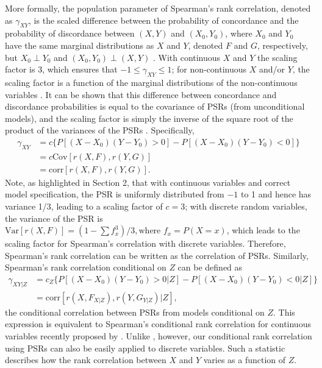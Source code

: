 \documentclass[12pt, usenatbib]{article}
\begin{document}
More formally, the population parameter of Spearman's rank correlation, denoted as $\gamma_{XY}$, is the scaled difference between the probability of concordance and the probability of discordance between $(X,Y)$ and $(X_0,Y_0)$, where $X_0$ and $Y_0$ have the same marginal distributions as $X$ and $Y$, denoted $F$ and $G$, respectively, but $X_0 \perp Y_0$ and $(X_0,Y_0) \perp (X,Y)$ \citep{kruskal1958}.  With continuous $X$ and $Y$ the scaling factor is 3, which ensures that $-1 \leq \gamma_{XY} \leq 1$;  for non-continuous $X$ and/or $Y$, the scaling factor is a function of the marginal distributions of the non-continuous variables \citep{neslehova2007}.  It can be shown that this difference between concordance and discordance probabilities is equal to the covariance of PSRs (from unconditional models), and the scaling factor is simply the inverse of the square root of the product of the variances of the PSRs  \citep{liu2016}.  Specifically,
\begin{align*}
\gamma_{XY}&=c\{P[(X-X_0)(Y-Y_0)>0]-P[(X-X_0)(Y-Y_0)<0]\} \\
&=c{\text{Cov}[r(X, F), r(Y, G)]} \\
&={\text{corr}[r(X, F), r(Y, G)]}.
\end{align*}
Note, as highlighted in Section 2, that with continuous variables and correct model specification, the PSR is uniformly distributed from $-1$ to 1 and hence has variance 1/3, leading to a scaling factor of $c=3$; with discrete random variables, the variance of the PSR is $\text{Var}[r(X, F)]=(1-\sum f_x^3)/3, \text{where }f_x=P(X=x)$, which leads to the scaling factor for Spearman's correlation with discrete variables.  Therefore, Spearman's rank correlation can be written as the correlation of PSRs.  
Similarly, Spearman's rank correlation conditional on $Z$ can be defined as
\begin{align*}
 \gamma_{XY|Z}&=c_Z \{P[(X-X_0)(Y-Y_0)>0|Z]-P[(X-X_0)(Y-Y_0)<0|Z]\} \\
     &=\text{corr}[r(X, F_{X|Z}), r(Y,G_{Y|Z}) |Z],
 \end{align*}
 the conditional correlation between PSRs from models conditional on $Z$.  This expression is equivalent to Spearman's conditional rank correlation for continuous variables recently proposed by  \cite{gijbels2011}.  Unlike \cite{gijbels2011}, however, our conditional rank correlation using PSRs can also be easily applied to discrete variables.  Such a statistic describes how the rank correlation between $X$ and $Y$ varies as a function of $Z$.  
 
\end{document}

